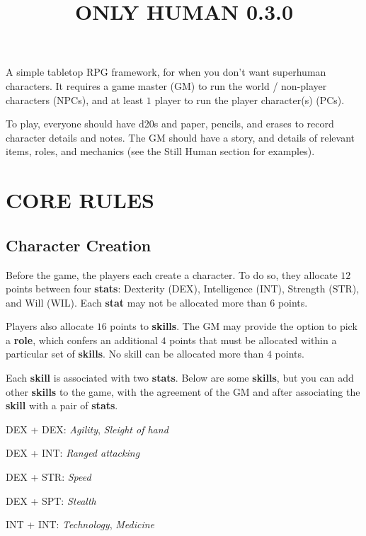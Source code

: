 \documentclass[11pt]{article}
\title{\vspace{-4ex}ONLY HUMAN 0.3.0\vspace{-6.5ex}}
\date{}
\begin{document}
\begin{multicols}{3}
  \maketitle

  A simple tabletop RPG framework, for when you don't want superhuman characters. It requires a game master (GM) to run the world / non-player characters (NPCs), and at least $1$ player to run the player character(s) (PCs).

  To play, everyone should have d20s and paper, pencils, and erases to record character details and notes. The GM should have a story, and details of relevant items, roles, and mechanics (see the Still Human section for examples).

  \section*{CORE RULES}

  \subsection*{Character Creation}

  Before the game, the players each create a character. To do so, they allocate $12$ points between four \textbf{stats}: Dexterity (DEX), Intelligence (INT), Strength (STR), and Will (WIL). Each \textbf{stat} may not be allocated more than $6$ points.

  Players also allocate $16$ points to \textbf{skills}. The GM may provide the option to pick a \textbf{role}, which confers an additional $4$ points that must be allocated within a particular set of \textbf{skills}. No skill can be allocated more than $4$ points.

  Each \textbf{skill} is associated with two \textbf{stats}. Below are some \textbf{skills}, but you can add other \textbf{skills} to the game, with the agreement of the GM and after associating the \textbf{skill} with a pair of \textbf{stats}.

  \begin{multicols}{2}
    DEX + DEX: ​\textit{Agility​},​ \textit{Sleight of hand}

    DEX + INT: \textit{​Ranged attacking​}

    DEX + STR: ​\textit{Speed}

    DEX + SPT: ​\textit{Stealth}

    INT + INT: ​\textit{Technology​},​ \textit{Medicine}


\end{multicols}
\end{multicols}
\end{document}
